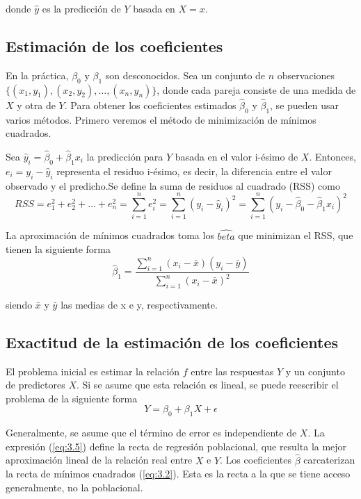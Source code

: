 \noindent donde $\hat{y}$ es la predicción de $Y$ basada en $X = x$.

\subsection{Estimación de los coeficientes}

En la práctica, $\beta_0$ y $\beta_1$ son desconocidos. Sea un conjunto de $n$ observaciones $\{(x_1, y_1), (x_2, y_2), \dots, (x_n, y_n)\}$, donde cada pareja consiste de una medida de $X$ y otra de $Y$. Para obtener los coeficientes estimados $\hat{\beta}_0$ y $\hat{\beta}_1$, se pueden usar varios métodos. Primero veremos el método de minimización de mínimos cuadrados. 

Sea $\hat{y}_i = \hat{\beta}_0 + \hat{\beta}_1 x_i$ la predicción para $Y$ basada en el valor i-ésimo de $X$. Entonces, $e_i = y_i - \hat{y}_i$ representa el residuo i-ésimo, es decir, la diferencia entre el valor observado y el predicho.Se define la suma de residuos al cuadrado (RSS) como 
\begin{equation}
RSS = e_1^2 + e_2^2 + \dots + e_n^2 = \sum_{i=1}^n e_i^2 = \sum_{i=1}^n (y_i - \hat{y}_i)^2 = \sum_{i=1}^n (y_i - \hat{\beta}_0 - \hat{\beta}_1 x_i)^2
\end{equation}

La aproximación de mínimos cuadrados toma los $\hat{beta}$ que minimizan el RSS, que tienen la siguiente forma 
\begin{equation}
\hat{\beta}_1 = \frac{\sum_{i=1}^n (x_i - \bar{x})(y_i - \bar{y})}{\sum_{i=1}^n (x_i - \bar{x})^2}
\end{equation}

\noindent siendo $\bar{x}$ y $\bar{y}$ las medias de x e y, respectivamente.

\subsection{Exactitud de la estimación de los coeficientes}

El problema inicial es estimar la relación $f$ entre las respuestas $Y$ y un conjunto de predictores $X$. Si se asume que esta relación es lineal, se puede reescribir el problema de la siguiente forma
\begin{equation}
Y = \beta_0 + \beta_1 X + \epsilon \label{eq:3.5}
\end{equation}

Generalmente, se asume que el término de error es independiente de $X$. La expresión (\ref{eq:3.5}) define la recta de regresión poblacional, que resulta la mejor aproximación lineal de la relación real entre $X$ e $Y$. Los coeficientes $\hat{\beta}$ carcaterizan la recta de mínimos cuadrados (\ref{eq:3.2}). Esta es la recta a la que se tiene acceso generalmente, no la poblacional. \\


